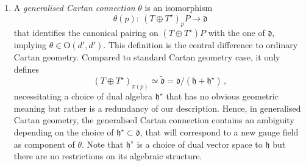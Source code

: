 \documentclass[11pt,a4paper]{article}
\numberwithin{equation}{section}
\begin{document}
\begin{enumerate}
\begin{itemize}
\begin{itemize}
	\item Background geometries that are interesting for generalised dualities are the motivation behind \cite{Butter:2022iza} and correspond to dressing cosets $H/D\backslash F$ with some underlying double Lie group $D$. Then the underlying model algebra $\mathfrak{d}$ is given as the Lie algebra to $D$. Its necessary assumptions here are, in general, smaller 
\end{itemize}
    \end{itemize}
    
    \item A \textit{generalised Cartan connection} $\theta$ is an isomorphism
    \begin{equation}
        \theta(p): \ (T \oplus T^\star)_p P \rightarrow \mathfrak{d} \label{eq:GeneralisedCartanConnectionDefinition}
    \end{equation}
    that identifies the canonical pairing on $(T\oplus T^\star)P$ with the one of $\mathfrak{d}$, implying $\theta \in$O$(d',d')$. This definition is the central difference to ordinary Cartan geometry. Compared to standard Cartan geometry case, it only defines
    \begin{equation}
      (T \oplus T^\star)_{\pi(p)} \simeq \mathfrak{\tilde{d}} = \mathfrak{d}/(\mathfrak{h} + \mathfrak{h}^\star)\,,
    \end{equation}
    necessitating a choice of dual algebra $\mathfrak{h}^\star$ that has no obvious geometric meaning but rather is a redundancy of our description. Hence, in generalised Cartan geometry, the generalised Cartan connection contains an ambiguity depending on the choice of $\mathfrak{h}^\star \subset \mathfrak{d}$, that will correspond to a new gauge field as component of $\theta$. Note that $\mathfrak{h}^\star$ is a choice of dual vector space to $\mathfrak{h}$ but there are no restrictions on its algebraic structure.
    

\end{enumerate}
\end{document}
